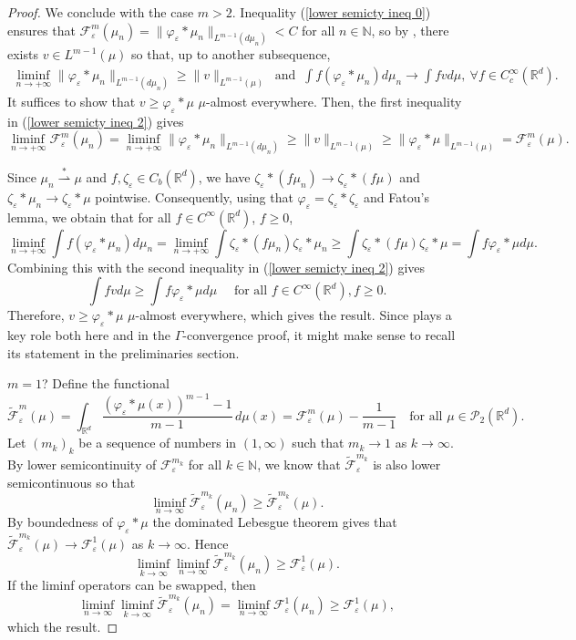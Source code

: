 \documentclass[11pt,leqno]{amsart}
\theoremstyle{definition}
\newcommand{\bes}{\begin{equation*}}
\newcommand{\ees}{\end{equation*}}
\newcommand{\comment}[1]{{\color{red}#1}} %
\newcommand{\kcomment}[1]{{\color{Aquamarine}#1}} %
\newcommand{\Rd}{{\mathord{\mathbb R}^d}}
\newcommand{\N}{{\mathord{\mathbb N}}}
\newcommand{\wsto}{\stackrel{*}{\rightharpoonup}}
\newcommand{\F}{\mathcal{F}}
\def\P{{\mathcal P}}
\def\e{\varepsilon}
\def\F{\mathcal{F}}
\begin{document}
\begin{proof}
 We conclude with the case $m > 2$. Inequality (\ref{lower semicty ineq 0}) ensures that $\F^m_\e(\mu_n) = \|\varphi_\e*\mu_n\|_{L^{m-1}(d \mu_n)} < C$ for all $n \in \mathbb{N}$, so by \cite[Theorem 5.4.4]{AGS}, there exists $v \in L^{m-1}(\mu)$ so that, up to another subsequence, 
 \begin{align} \label{lower semicty ineq 2} \liminf_{n \to +\infty} \|\varphi_\e*\mu_n\|_{L^{m-1}(d \mu_n)} \geq  \|v\|_{L^{m-1}(\mu)} \ \text{ and } \  \int f (\varphi_\e *\mu_n) d \mu_n \to \int f v d \mu,  \ \forall f \in C^\infty_c(\Rd). 
 \end{align}
 It suffices to show that $v \geq \varphi_\e*\mu$ $\mu$-almost everywhere. Then, the first inequality in (\ref{lower semicty ineq 2}) gives
 \[ \liminf_{n \to +\infty} \F^m_\e(\mu_n) = \liminf_{n \to +\infty} \|\varphi_\e*\mu_n\|_{L^{m-1}(d \mu_n)} \geq  \|v\|_{L^{m-1}(\mu)} \geq \|\varphi_\e*\mu \|_{L^{m-1}(\mu)} = \F_\e^m(\mu) . \]

Since $\mu_n \wsto \mu$ and $f, \zeta_\e \in C_b(\Rd)$, we have $\zeta_\e*( f \mu_n) \to \zeta_\e*( f \mu)$ and $\zeta_\e*\mu_n \to \zeta_\e *\mu$ pointwise.
Consequently, using that $\varphi_\e = \zeta_\e *\zeta_\e$ and Fatou's lemma, we obtain that for all $f \in C^\infty(\Rd)$, $f \geq 0$, 
\[ \liminf_{n \to +\infty} \int f (\varphi_\e *\mu_n) d \mu_n = \liminf_{n \to +\infty} \int \zeta_\e*( f \mu_n) \zeta_\e*\mu_n \geq \int \zeta_\e *(f \mu) \zeta_\e *\mu = \int f \varphi_\e* \mu d \mu .\]
Combining this with the second inequality in (\ref{lower semicty ineq 2}) gives
\[ \int f v d \mu \geq \int f \varphi_\e* \mu d \mu \quad \text{ for all } f \in C^\infty(\Rd), f \geq 0 .\]
Therefore, $v \geq \varphi_\e* \mu$ $\mu$-almost everywhere, which gives the result.
 \kcomment{Since \cite[Theorem 5.4.4]{AGS} plays a key role both here and in the $\Gamma$-convergence proof, it might make sense to recall its statement in the preliminaries section.}
 
\comment{$m=1$?}
Define the functional 
\bes	
	\tilde{\F}_\e^m(\mu) = \int_{\Rd} \frac{(\varphi_\e*\mu(x))^{m-1}-1}{m-1} \,d\mu(x) = \F_\e^m(\mu) - \frac{1}{m-1} \quad \mbox{for all $\mu\in\P_2(\Rd)$}.
\ees
Let $(m_k)_k$ be a sequence of numbers in $(1,\infty)$ such that $m_k \to 1$ as $k\to\infty$. By lower semicontinuity of $\F_\e^{m_k}$ for all $k\in\N$, we know that $\tilde{\F}_\e^{m_k}$ is also lower semicontinuous so that
\bes
	\liminf_{n\to\infty}\tilde{\F}_\e^{m_k}(\mu_n) \geq \tilde{\F}_\e^{m_k}(\mu).
\ees
By boundedness of $\varphi_\e*\mu$ the dominated Lebesgue theorem gives that $\tilde{\F}_\e^{m_k}(\mu) \to \F_\e^1(\mu)$ as $k\to\infty$. Hence
\bes	
\liminf_{k\to\infty}\liminf_{n\to\infty}\tilde{\F}_\e^{m_k}(\mu_n) \geq \F_\e^1(\mu).
\ees
\comment{If the liminf operators can be swapped}, then 
\bes
\liminf_{n\to\infty}\liminf_{k\to\infty}\tilde{\F}_\e^{m_k}(\mu_n) = \liminf_{n\to\infty} \F_\e^1(\mu_n) \geq \F_\e^1(\mu),
\ees
which the result.
\end{proof}
\end{document}
